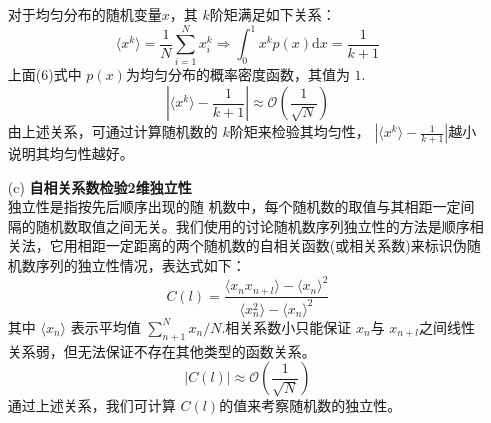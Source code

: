 \documentclass[12pt,a4paper,utf8]{ctexart}
\begin{document}
\begin{enumerate}
        对于均匀分布的随机变量$x$，其 $k$阶矩满足如下关系：
\begin{equation}
    \langle x^k \rangle= \frac{1}{N} \sum_{i=1}^{N}x_i^k \Rightarrow \int_0^1
    x^k p(x) \textrm{d}x = \frac{1}{k+1}
\end{equation}
上面(6)式中 $p(x)$为均匀分布的概率密度函数，其值为 $1$.\\
\begin{equation}
    \left | \langle x^k \rangle - \frac{1}{k+1} \right | \approx\mathcal{O} \left (
    \frac{1}{\sqrt{N}} \right )
\end{equation}
由上述关系，可通过计算随机数的 $k$阶矩来检验其均匀性， $\left | \langle x^k
\rangle - \frac{1}{k+1} \right | $越小说明其均匀性越好。
    \item[(c)] \textbf{自相关系数检验2维独立性}\\
        独立性是指按先后顺序出现的随 机数中，每个随机数的取值与其相距一定间隔的随机数取值之间无关。我们使用的讨论随机数序列独立性的方法是顺序相关法，它用相距一定距离的两个随机数的自相关函数(或相关系数)来标识伪随机数序列的独立性情况，表达式如下：
\begin{equation}
    C(l)= \frac{\langle x_n x_{n+l} \rangle - \langle x_n \rangle ^2}{\langle
    x_n^2 \rangle - \langle x_n \rangle ^2}
\end{equation}
其中 $\langle x_n \rangle$ 表示平均值 $ \sum_{n+1}^{N}x_n /N$.相关系数小只能保证
$x_n$与 $x_{n+l}$之间线性关系弱，但无法保证不存在其他类型的函数关系。
\begin{equation}
    \left | C(l) \right | \approx \mathcal{O} \left ( \frac{1}{\sqrt{N}} \right
        )
\end{equation}
通过上述关系，我们可计算 $C(l)$的值来考察随机数的独立性。
\end{enumerate}
\end{document}
